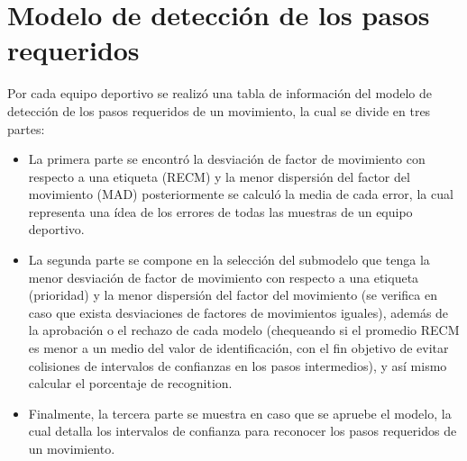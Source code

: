\section{Modelo de detecci\'on de los pasos requeridos} \label{res:chooseModel}
Por cada equipo deportivo se realiz\'o una tabla de informaci\'on del modelo de detecci\'on de los pasos requeridos de un movimiento, la cual se divide en tres partes:
\begin{itemize}
\item  La primera parte se encontr\'o la desviaci\'on de factor de movimiento con respecto a una etiqueta  (RECM) y la menor dispersi\'on del factor del movimiento (MAD) posteriormente se calcul\'o la media de cada error, la cual representa una \'idea de los  errores de todas las muestras de un equipo deportivo.
\item  La segunda parte se compone en la selecci\'on del submodelo que tenga la menor desviaci\'on de factor de movimiento con respecto a una etiqueta  (prioridad) y la menor dispersi\'on del factor del movimiento  (se verifica en caso que exista desviaciones de factores de movimientos iguales), adem\'as de la aprobaci\'on o el rechazo de cada modelo (chequeando si el promedio RECM es menor a un medio del valor de identificaci\'on, con el fin objetivo de evitar colisiones de intervalos de confianzas en los pasos intermedios),  y as\'i mismo calcular el porcentaje de recognition.
\item Finalmente, la tercera parte se muestra en caso que se apruebe el modelo, la cual detalla los intervalos de confianza para reconocer los pasos requeridos  de un movimiento.
\end{itemize}
